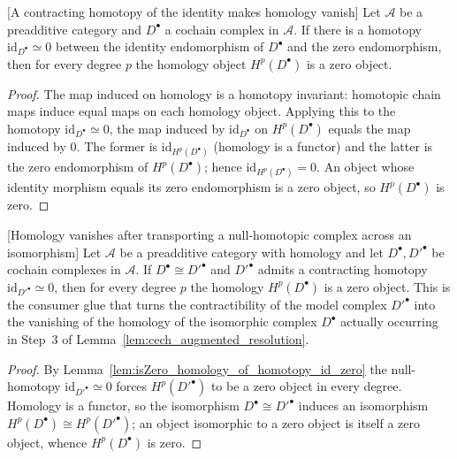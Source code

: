 \begin{lemma}

[A contracting homotopy of the identity makes homology vanish]
  \label{lem:isZero_homology_of_homotopy_id_zero}
  Let \(\mathcal{A}\) be a preadditive category and \(D^\bullet\) a cochain complex in
  \(\mathcal{A}\). If there is a homotopy \(\mathrm{id}_{D^\bullet} \simeq 0\) between the
  identity endomorphism of \(D^\bullet\) and the zero endomorphism, then for every degree
  \(p\) the homology object \(H^p(D^\bullet)\) is a zero object.
\end{lemma}
\begin{proof}
  The map induced on homology is a homotopy invariant: homotopic chain maps induce equal
  maps on each homology object. Applying this to the homotopy \(\mathrm{id}_{D^\bullet}
  \simeq 0\), the map induced by \(\mathrm{id}_{D^\bullet}\) on \(H^p(D^\bullet)\) equals the
  map induced by \(0\). The former is \(\mathrm{id}_{H^p(D^\bullet)}\) (homology is a
  functor) and the latter is the zero endomorphism of \(H^p(D^\bullet)\); hence
  \(\mathrm{id}_{H^p(D^\bullet)} = 0\). An object whose identity morphism equals its zero
  endomorphism is a zero object, so \(H^p(D^\bullet)\) is zero.
\end{proof}

\begin{lemma}

[Homology vanishes after transporting a null-homotopic complex across an isomorphism]
  \label{lem:isZero_homology_of_iso_homotopy_id_zero}
  Let \(\mathcal{A}\) be a preadditive category with homology and let \(D^\bullet, D'^\bullet\) be
  cochain complexes in \(\mathcal{A}\). If \(D^\bullet \cong D'^\bullet\) and \(D'^\bullet\) admits
  a contracting homotopy \(\mathrm{id}_{D'^\bullet} \simeq 0\), then for every degree \(p\) the
  homology \(H^p(D^\bullet)\) is a zero object. This is the consumer glue that turns the
  contractibility of the model complex \(D'^\bullet\) into the vanishing of the homology of the
  isomorphic complex \(D^\bullet\) actually occurring in Step~3 of
  Lemma~\ref{lem:cech_augmented_resolution}.
\end{lemma}
\begin{proof}
  By Lemma~\ref{lem:isZero_homology_of_homotopy_id_zero} the null-homotopy \(\mathrm{id}_{D'^\bullet}
  \simeq 0\) forces \(H^p(D'^\bullet)\) to be a zero object in every degree. Homology is a functor,
  so the isomorphism \(D^\bullet \cong D'^\bullet\) induces an isomorphism \(H^p(D^\bullet) \cong
  H^p(D'^\bullet)\); an object isomorphic to a zero object is itself a zero object, whence
  \(H^p(D^\bullet)\) is zero.
\end{proof}


